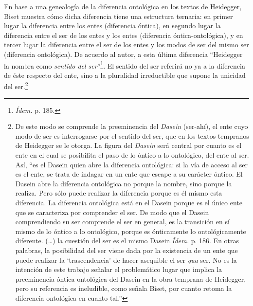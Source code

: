 En base a una genealogía de la diferencia ontológica en los textos de Heidegger, Biset muestra cómo dicha diferencia tiene una estructura ternaria: en primer lugar la diferencia entre los entes (diferencia óntica), en segundo lugar la diferencia entre el ser de los entes y los entes (diferencia óntica-ontológica), y en tercer lugar la diferencia entre el ser de los entes y los modos de ser del mismo ser (diferencia ontológica). De acuerdo al autor, a esta última diferencia \enquote{Heidegger la nombra como \emph{sentido del ser}}\footnote{\emph{Ídem.} p. 185.}. El sentido del ser referirá no ya a la diferencia de éste respecto del ente, sino a la pluralidad irreductible que supone la unicidad del ser.\footnote{De este modo se comprende la preeminencia del \emph{Dasein} (ser-ahí), el ente cuyo modo de ser es interrogarse por el sentido del ser, que en los textos tempranos de Heidegger se le otorga. La figura del \emph{Dasein} será central por cuanto es el ente en el cual se posibilita el paso de lo óntico a lo ontológico, del ente al ser. Así, \enquote{{es el Dasein quien abre la diferencia ontológica: si la vía de acceso al ser es el ente, se trata de indagar en un ente que escape a su carácter óntico. El Dasein abre la diferencia ontológica no porque la nombre, sino porque la realiza. Pero sólo puede realizar la diferencia porque es él mismo esta diferencia. La diferencia ontológica está en el Dasein porque es el único ente que se caracteriza por comprender el ser. De modo que el Dasein comprendiendo su ser comprende el ser en general, es la transición en sí mismo de lo óntico a lo ontológico, porque es ónticamente lo ontológicamente diferente. (\dots) la cuestión del ser es el mismo Dasein}.\emph{Ídem.} p. 186. En otras palabras, la posibilidad del ser  viene dada por la existencia de un ente que puede realizar la \enquote{trascendencia} de hacer asequible el ser-\emph{qua}-ser. No es la intención de este trabajo señalar el problemático lugar que implica la preeminencia óntica-ontológica del Dasein en la obra temprana de Heidegger, pero su referencia es ineludible, como señala Biset, por cuanto retoma la diferencia ontológica en cuanto tal.}}

